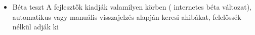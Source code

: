 \begin{enumerate}
\begin{itemize}
\begin{itemize}
					\item Béta teszt
						A fejlesztők kiadják valamilyen körben ( internetes béta változat), automatikus vagy manuális visszajelzés alapján keresi ahibákat, felelőssék nélkül adják ki
				\end{itemize}
			\end{itemize}
	\end{enumerate}
